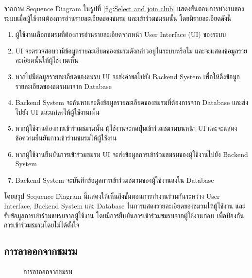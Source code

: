 \documentclass[14pt,oneside,openright,a4paper]{cpe-thai-project}
\begin{document}
  จากภาพ Sequence Diagram ในรูปที่ \ref{fig:Select and join club} แสดงขั้นตอนการทำงานของระบบเมื่อผู้ใช้งานต้องการอ่านรายละเอียดของชมรม และเข้าร่วมชมรมนั้น โดยมีรายละเอียดดังนี้
  \begin{enumerate}
    \item ผู้ใช้งานเลือกชมรมที่ต้องการอ่านรายละเอียดจากหน้า User Interface (UI) ของระบบ
    \item UI จะตรวจสอบว่ามีข้อมูลรายละเอียดของชมรมดังกล่าวอยู่ในระบบหรือไม่ และจะแสดงข้อมูลรายละเอียดนั้นให้ผู้ใช้งานเห็น
    \item หากไม่มีข้อมูลรายละเอียดของชมรม UI จะส่งคำขอไปยัง Backend System เพื่อให้ดึงข้อมูลรายละเอียดของชมรมมาจาก Database
    \item Backend System จะค้นหาและดึงข้อมูลรายละเอียดของชมรมที่ต้องการจาก Database และส่งไปยัง UI และแสดงให้ผู้ใช้งานเห็น
    \item หากผู้ใช้งานต้องการเข้าร่วมชมรมนั้น ผู้ใช้งานจะกดปุ่มเข้าร่วมชมรมบนหน้า UI และจะแสดงข้อความยืนยันการเข้าร่วมชมรมให้ผู้ใช้งาน
    \item หากผู้ใช้งานยืนยันการเข้าร่วมชมรม UI จะส่งข้อมูลการเข้าร่วมชมรมของผู้ใช้งานไปยัง Backend System
    \item Backend System จะบันทึกข้อมูลการเข้าร่วมชมรมของผู้ใช้งานลงใน Database
  \end{enumerate}

  โดยสรุป Sequence Diagram นี้แสดงให้เห็นถึงขั้นตอนการทำงานร่วมกันระหว่าง User Interface, Backend System และ Database ในการแสดงรายละเอียดของชมรมให้ผู้ใช้งาน และรับข้อมูลการเข้าร่วมชมรมจากผู้ใช้งาน โดยมีการยืนยันการเข้าร่วมชมรมจากผู้ใช้งานก่อน เพื่อป้องกันการเข้าร่วมชมรมโดยไม่ได้ตั้งใจ


\subsection{การลาออกจากชมรม}

  \begin{figure}[!h]\centering
    \setlength{\fboxrule}{0.5mm} %
    \setlength{\fboxsep}{0.5cm}
    \caption{การลาออกจากชมรม}\label{fig:Club resignation}
  \end{figure}
\end{document}
